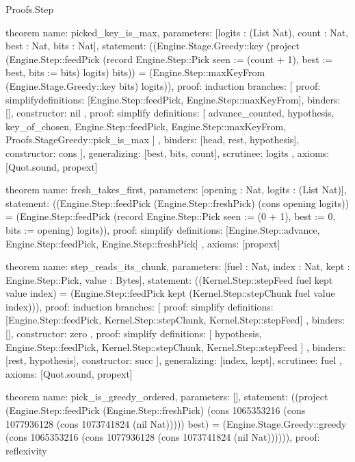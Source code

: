 \begin{lexlean}{Proofs.Step}
\begin{semanticmodule}
theorem{
  name: picked_key_is_max,
  parameters: [logits : (List Nat), count : Nat, best : Nat, bits : Nat],
  statement: ((Engine.Stage.Greedy::key (project (Engine.Step::feedPick (record Engine.Step::Pick {seen := (count + 1), best := best, bits := bits}) logits) bits)) = (Engine.Step::maxKeyFrom (Engine.Stage.Greedy::key bits) logits)),
  proof: induction{
    branches: [
      {
        proof: simplify{definitions: [Engine.Step::feedPick, Engine.Step::maxKeyFrom]},
        binders: [],
        constructor: nil
      },
      {
        proof: simplify{
          definitions: [
            advance_counted,
            hypothesis,
            key_of_chosen,
            Engine.Step::feedPick,
            Engine.Step::maxKeyFrom,
            Proofs.StageGreedy::pick_is_max
          ]
        },
        binders: [head, rest, hypothesis],
        constructor: cons
      }
    ],
    generalizing: [best, bits, count],
    scrutinee: logits
  },
  axioms: [Quot.sound, propext]
}

theorem{
  name: fresh_takes_first,
  parameters: [opening : Nat, logits : (List Nat)],
  statement: ((Engine.Step::feedPick (Engine.Step::freshPick) (cons opening logits)) = (Engine.Step::feedPick (record Engine.Step::Pick {seen := (0 + 1), best := 0, bits := opening}) logits)),
  proof: simplify{
    definitions: [Engine.Step::advance, Engine.Step::feedPick, Engine.Step::freshPick]
  },
  axioms: [propext]
}

theorem{
  name: step_reads_its_chunk,
  parameters: [fuel : Nat, index : Nat, kept : Engine.Step::Pick, value : Bytes],
  statement: ((Kernel.Step::stepFeed fuel kept value index) = (Engine.Step::feedPick kept (Kernel.Step::stepChunk fuel value index))),
  proof: induction{
    branches: [
      {
        proof: simplify{
          definitions: [Engine.Step::feedPick, Kernel.Step::stepChunk, Kernel.Step::stepFeed]
        },
        binders: [],
        constructor: zero
      },
      {
        proof: simplify{
          definitions: [
            hypothesis,
            Engine.Step::feedPick,
            Kernel.Step::stepChunk,
            Kernel.Step::stepFeed
          ]
        },
        binders: [rest, hypothesis],
        constructor: succ
      }
    ],
    generalizing: [index, kept],
    scrutinee: fuel
  },
  axioms: [Quot.sound, propext]
}

theorem{
  name: pick_is_greedy_ordered,
  parameters: [],
  statement: ((project (Engine.Step::feedPick (Engine.Step::freshPick) (cons 1065353216 (cons 1077936128 (cons 1073741824 (nil Nat))))) best) = (Engine.Stage.Greedy::greedy (cons 1065353216 (cons 1077936128 (cons 1073741824 (nil Nat)))))),
  proof: reflexivity{}
}


\end{semanticmodule}
\end{lexlean}
